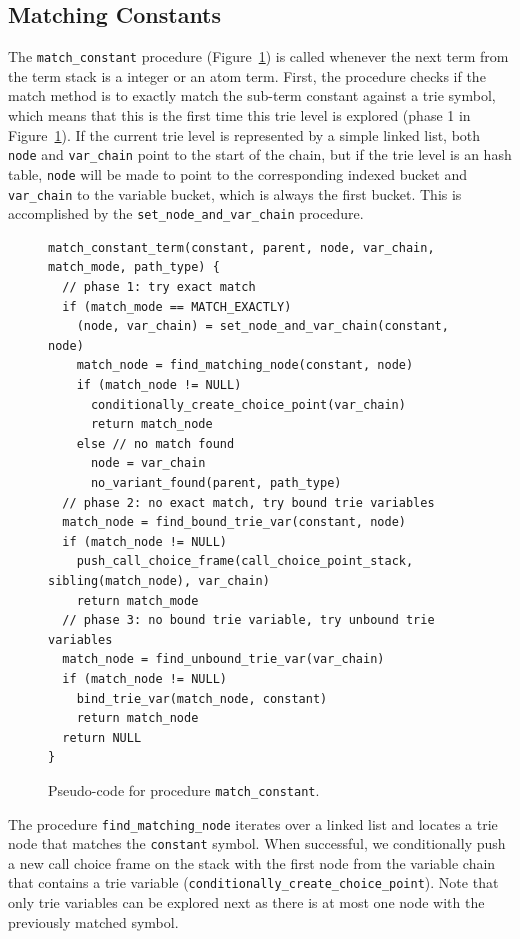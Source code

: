\subsection{Matching Constants}

The \texttt{match\_constant} procedure (Figure~\ref{fig:match_constant}) is called whenever the
next term from the term stack is a integer or an atom term.
First, the procedure checks if the match method is to exactly match the
sub-term constant against a trie symbol, which means
that this is the first time this trie level is explored (phase 1 in Figure~\ref{fig:match_constant}).
If the current trie level is represented by a simple linked list, both \texttt{node} and \texttt{var\_chain}
point to the start of the chain, but if the trie level is an hash table,
\texttt{node} will be made to point to the corresponding indexed bucket and \texttt{var\_chain}
to the variable bucket, which is always the first bucket. This is accomplished by the \texttt{set\_node\_and\_var\_chain}
procedure.

\begin{figure}[ht]
\begin{Verbatim}
match_constant_term(constant, parent, node, var_chain, match_mode, path_type) {
  // phase 1: try exact match
  if (match_mode == MATCH_EXACTLY)
    (node, var_chain) = set_node_and_var_chain(constant, node)
    match_node = find_matching_node(constant, node)
    if (match_node != NULL)
      conditionally_create_choice_point(var_chain)
      return match_node
    else // no match found
      node = var_chain
      no_variant_found(parent, path_type)
  // phase 2: no exact match, try bound trie variables
  match_node = find_bound_trie_var(constant, node)
  if (match_node != NULL)
    push_call_choice_frame(call_choice_point_stack, sibling(match_node), var_chain)
    return match_mode
  // phase 3: no bound trie variable, try unbound trie variables
  match_node = find_unbound_trie_var(var_chain)
  if (match_node != NULL)
    bind_trie_var(match_node, constant)
    return match_node
  return NULL
}
\end{Verbatim}
\caption{Pseudo-code for procedure \texttt{match\_constant}.}
\label{fig:match_constant}
\end{figure}

The procedure \texttt{find\_matching\_node} iterates over a linked list and locates a trie node that matches the
\texttt{constant} symbol. When successful, we conditionally push a new call choice frame on the stack
with the first node from the variable chain that contains a trie variable
(\texttt{conditionally\_create\_choice\_point}).
Note that only trie variables can be explored next as there is at most one node with the previously matched symbol.

